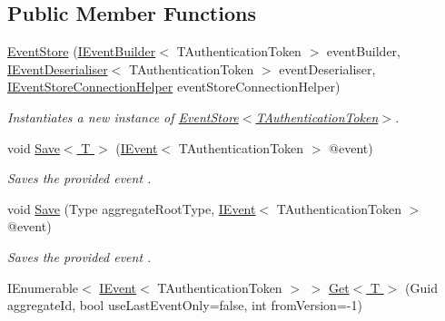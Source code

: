 \subsection*{Public Member Functions}
\begin{DoxyCompactItemize}
\item 
\hyperlink{classCqrs_1_1EventStore_1_1EventStore_ab48ad2c9d72780ae3a662e213498f194_ab48ad2c9d72780ae3a662e213498f194}{Event\+Store} (\hyperlink{interfaceCqrs_1_1EventStore_1_1IEventBuilder}{I\+Event\+Builder}$<$ T\+Authentication\+Token $>$ event\+Builder, \hyperlink{interfaceCqrs_1_1EventStore_1_1IEventDeserialiser}{I\+Event\+Deserialiser}$<$ T\+Authentication\+Token $>$ event\+Deserialiser, \hyperlink{interfaceCqrs_1_1EventStore_1_1IEventStoreConnectionHelper}{I\+Event\+Store\+Connection\+Helper} event\+Store\+Connection\+Helper)
\begin{DoxyCompactList}\small\item\em Instantiates a new instance of \hyperlink{classCqrs_1_1EventStore_1_1EventStore_ab48ad2c9d72780ae3a662e213498f194_ab48ad2c9d72780ae3a662e213498f194}{Event\+Store$<$\+T\+Authentication\+Token$>$}. \end{DoxyCompactList}\item 
void \hyperlink{classCqrs_1_1EventStore_1_1EventStore_a7261e5b74f55ef7afd23144c155ba116_a7261e5b74f55ef7afd23144c155ba116}{Save$<$ T $>$} (\hyperlink{interfaceCqrs_1_1Events_1_1IEvent}{I\+Event}$<$ T\+Authentication\+Token $>$ @event)
\begin{DoxyCompactList}\small\item\em Saves the provided {\itshape event} . \end{DoxyCompactList}\item 
void \hyperlink{classCqrs_1_1EventStore_1_1EventStore_adce33037e2a3eb81cfccded42ba2ed35_adce33037e2a3eb81cfccded42ba2ed35}{Save} (Type aggregate\+Root\+Type, \hyperlink{interfaceCqrs_1_1Events_1_1IEvent}{I\+Event}$<$ T\+Authentication\+Token $>$ @event)
\begin{DoxyCompactList}\small\item\em Saves the provided {\itshape event} . \end{DoxyCompactList}\item 
I\+Enumerable$<$ \hyperlink{interfaceCqrs_1_1Events_1_1IEvent}{I\+Event}$<$ T\+Authentication\+Token $>$ $>$ \hyperlink{classCqrs_1_1EventStore_1_1EventStore_aaa4ebd61c84124425380ce31e3a67600_aaa4ebd61c84124425380ce31e3a67600}{Get$<$ T $>$} (Guid aggregate\+Id, bool use\+Last\+Event\+Only=false, int from\+Version=-\/1)

\end{DoxyCompactItemize}
